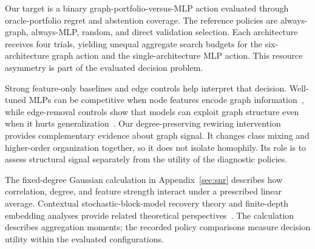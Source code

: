 Our target is a binary graph-portfolio-versus-MLP action evaluated through oracle-portfolio regret and abstention coverage. The reference policies are always-graph, always-MLP, random, and direct validation selection. Each architecture receives four trials, yielding unequal aggregate search budgets for the six-architecture graph action and the single-architecture MLP action. This resource asymmetry is part of the evaluated decision problem.

Strong feature-only baselines and edge controls help interpret that decision. Well-tuned MLPs can be competitive when node features encode graph information~\citep{katsman2026necessary}, while edge-removal controls show that models can exploit graph structure even when it hurts generalization~\citep{bechler2024graphs}. Our degree-preserving rewiring intervention provides complementary evidence about graph signal. It changes class mixing and higher-order organization together, so it does not isolate homophily. Its role is to assess structural signal separately from the utility of the diagnostic policies.

The fixed-degree Gaussian calculation in Appendix~\ref{sec:snr} describes how correlation, degree, and feature strength interact under a prescribed linear average. Contextual stochastic-block-model recovery theory and finite-depth embedding analyses provide related theoretical perspectives~\citep{lu2023contextual,pmlr-v269-dalle25a}. The calculation describes aggregation moments; the recorded policy comparisons measure decision utility within the evaluated configurations.
